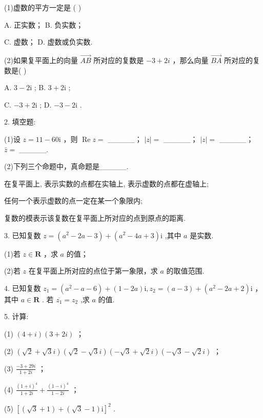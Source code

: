 \documentclass[10pt]{article}
\newcommand*\circled[1]{\tikz[baseline=(char.base)]{\node[shape=circle,draw,inner sep=1.5pt] (char) {\small #1};}}
\begin{document}
(1)虚数的平方一定是 ( )

A. 正实数； B. 负实数；

C. 虚数； D. 虚数或负实数.

(2)如果复平面上的向量 \(\overrightarrow{AB}\) 所对应的复数是 \(- 3 + {2i}\) ，那么向量 \(\overrightarrow{BA}\) 所对应的复数是( )

A. \(3 - 2\mathrm{i}\) ; B. \(3 + 2\mathrm{i}\) ;

C. \(- 3 + 2\mathrm{i}\) ; D. \(- 3 - 2\mathrm{i}\) .

2. 填空题:

(1)设 \(z = {11} - {{60}\mathrm{i}}\) ，则 \(\operatorname{Re}z =\) \_\_\_\_\_； \(\left| z\right|  =\) \_\_\_\_\_； \(\left| z\right|  =\) \_\_\_\_\_； \(\bar{z} =\) \_\_\_\_\_.

(2)下列三个命题中，真命题是\_\_\_\_\_.

 \circled{1}  在复平面上, 表示实数的点都在实轴上, 表示虚数的点都在虚轴上;

 \circled{2}  任何一个表示虚数的点一定在某一个象限内;

 \circled{3}  复数的模表示该复数在复平面上所对应的点到原点的距离.

3. 已知复数 \(z = \left( {{a}^{2} - {2a} - 3}\right)  + \left( {{a}^{2} - {4a} + 3}\right) \mathrm{i}\) ,其中 \(a\) 是实数.

(1)若 \(z \in  \mathbf{R}\) ，求 \(a\) 的值；

(2)若 \(z\) 在复平面上所对应的点位于第一象限，求 \(a\) 的取值范围.

4. 已知复数 \({z}_{1} = \left( {{a}^{2} - a - 6}\right)  + \left( {1 - {2a}}\right) \mathrm{i},{z}_{2} = \left( {a - 3}\right)  + \left( {{a}^{2} - {2a} + 2}\right) \mathrm{i}\) ，其中 \(a \in  \mathbf{R}\) . 若 \(\overline{{z}_{1}} = {z}_{2}\) ,求 \(a\) 的值.

5. 计算:

(1) \(\left( {4 + i}\right) \left( {3 + {2i}}\right)\) ；

(2) \(\left( {\sqrt{2} + \sqrt{3}i}\right) \left( {\sqrt{2} - \sqrt{3}i}\right) \left( {-\sqrt{3} + \sqrt{2}i}\right) \left( {-\sqrt{3} - \sqrt{2}i}\right)\) ；

(3) \(\frac{-3 + {29i}}{1 + {2i}}\) ；

(4) \(\frac{{\left( 1 + i\right) }^{4}}{1 + {2i}} + \frac{{\left( 1 - i\right) }^{4}}{1 - {2i}}\) ；

(5) \({\left\lbrack  \left( \sqrt{3} + 1\right)  + \left( \sqrt{3} - 1\right) \mathrm{i}\right\rbrack  }^{2}\) .
\end{document}
